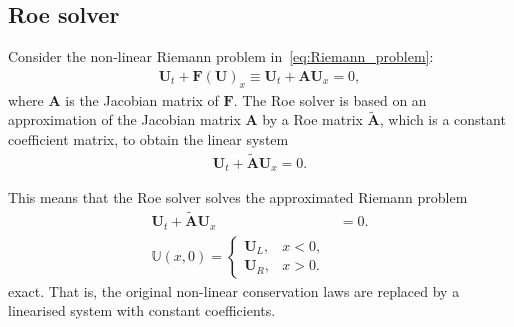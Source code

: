 \subsection{Roe solver}
Consider the non-linear Riemann problem in~\eqref{eq:Riemann_problem}:
\begin{align*}
    \mathbf{U}_t + \mathbf{F(U)}_x \equiv \mathbf{U}_t + \mathbf{A} \mathbf{U}_x = 0,
\end{align*}
where $\mathbf{A}$ is the Jacobian matrix of $\mathbf{F}$. 
The Roe solver is based on an approximation of the Jacobian matrix $\mathbf{A}$ by a Roe matrix $\tilde{\mathbf{A}}$, which is a constant coefficient matrix, to obtain the linear system
\begin{align*}
    \mathbf{U}_t + \mathbf{\tilde{A}} \mathbf{U}_x = 0.
\end{align*}

This means that the Roe solver solves the approximated Riemann problem
\begin{align*}
    \mathbf{U}_t + \mathbf{\tilde{A}} \mathbf{U}_x &= 0. \\
    \mathbb{U}(x,0) = \begin{cases}
        \mathbf{U}_L, & x < 0, \\
        \mathbf{U}_R, & x > 0.
    \end{cases}
\end{align*}
exact.
That is, the original non-linear conservation laws are replaced by a linearised system with constant coefficients.

